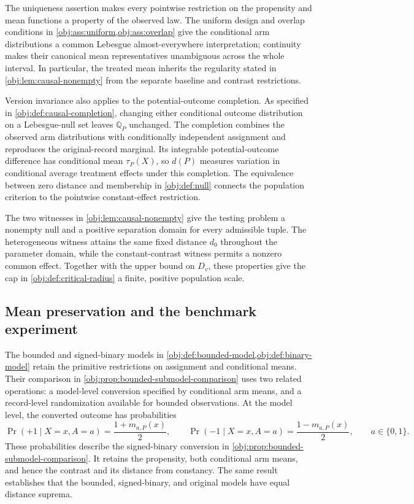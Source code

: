 The uniqueness assertion makes every pointwise restriction on the propensity and mean functions a property of the observed law. The uniform design and overlap conditions in \cref{obj:ass:uniform,obj:ass:overlap} give the conditional arm distributions a common Lebesgue almost-everywhere interpretation; continuity makes their canonical mean representatives unambiguous across the whole interval. In particular, the treated mean inherits the regularity stated in \cref{obj:lem:causal-nonempty} from the separate baseline and contrast restrictions.

Version invariance also applies to the potential-outcome completion. As specified in \cref{obj:def:causal-completion}, changing either conditional outcome distribution on a Lebesgue-null set leaves \(\mathbb Q_P\) unchanged. The completion combines the observed arm distributions with conditionally independent assignment and reproduces the original-record marginal. Its integrable potential-outcome difference has conditional mean \(\tau_P(X)\), so \(d(P)\) measures variation in conditional average treatment effects under this completion. The equivalence between zero distance and membership in \cref{obj:def:null} connects the population criterion to the pointwise constant-effect restriction.

The two witnesses in \cref{obj:lem:causal-nonempty} give the testing problem a nonempty null and a positive separation domain for every admissible tuple. The heterogeneous witness attains the same fixed distance \(d_0\) throughout the parameter domain, while the constant-contrast witness permits a nonzero common effect. Together with the upper bound on \(D_v\), these properties give the cap in \cref{obj:def:critical-radius} a finite, positive population scale.

\subsection{Mean preservation and the benchmark experiment}

The bounded and signed-binary models in \cref{obj:def:bounded-model,obj:def:binary-model} retain the primitive restrictions on assignment and conditional means. Their comparison in \cref{obj:prop:bounded-submodel-comparison} uses two related operations: a model-level conversion specified by conditional arm means, and a record-level randomization available for bounded observations. At the model level, the converted outcome has probabilities
\[
\Pr(+1\mid X=x,A=a)=\frac{1+m_{a,P}(x)}2,
\qquad
\Pr(-1\mid X=x,A=a)=\frac{1-m_{a,P}(x)}2,
\qquad a\in\{0,1\}.
\]
These probabilities describe the signed-binary conversion in \cref{obj:prop:bounded-submodel-comparison}. It retains the propensity, both conditional arm means, and hence the contrast and its distance from constancy. The same result establishes that the bounded, signed-binary, and original models have equal distance suprema.

